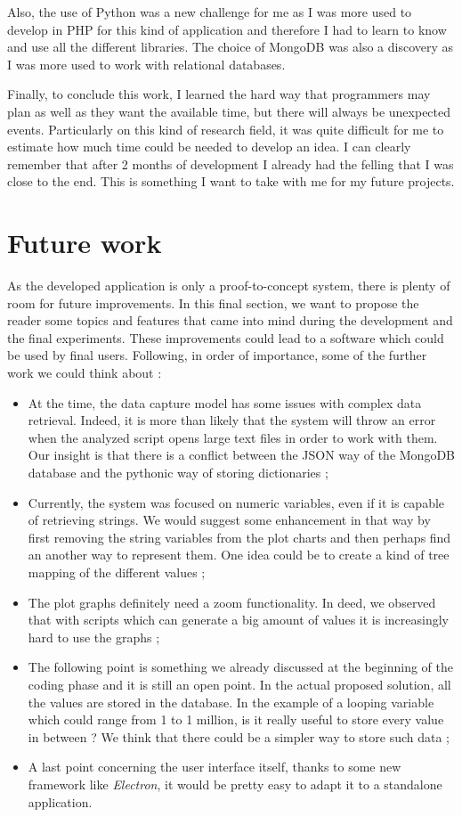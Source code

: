 Also, the use of Python was a new challenge for me as I was more used to develop in PHP for this kind of application and therefore I had to learn to know and use all the different libraries. The choice of MongoDB was also a discovery as I was more used to work with relational databases.

Finally, to conclude this work, I learned the hard way that programmers may plan as well as they want the available time, but there will always be unexpected events. Particularly on this kind of research field, it was quite difficult for me to estimate how much time could be needed to develop an idea. I can clearly remember that after 2 months of development I already had the felling that I was close to the end. This is something I want to take with me for my future projects.

\section{Future work}
As the developed application is only a proof-to-concept system, there is plenty of room for future improvements. In this final section, we want to propose the reader some topics and features that came into mind during the development and the final experiments. These improvements could lead to a software which could be used by final users. Following, in order of importance, some of the further work we could think about :
\begin{itemize}
  \item At the time, the data capture model has some issues with complex data retrieval. Indeed, it is more than likely that the system will throw an error when the analyzed script opens large text files in order to work with them. Our insight is that there is a conflict between the JSON way of the MongoDB database and the pythonic way of storing dictionaries ;
  \item Currently, the system was focused on numeric variables, even if it is capable of retrieving strings. We would suggest some enhancement in that way by first removing the string variables from the plot charts and then perhaps find an another way to represent them. One idea could be to create a kind of tree mapping of the different values ;
  \item The plot graphs definitely need a zoom functionality. In deed, we observed that with scripts which can generate a big amount of values it is increasingly hard to use the graphs ; 
  \item The following point is something we already discussed at the beginning of the coding phase and it is still an open point. In the actual proposed solution, all the values are stored in the database. In the example of a looping variable which could range from 1 to 1 million, is it really useful to store every value in between ? We think that there could be a simpler way to store such data ;
  \item A last point concerning the user interface itself, thanks to some new framework like \textit{Electron}, it would be pretty easy to adapt it to a standalone application.
\end{itemize}
  
